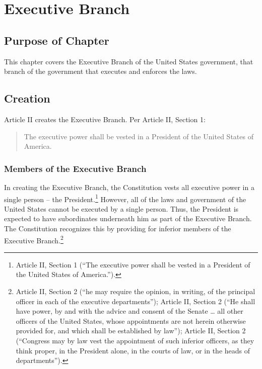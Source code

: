 %
%
%
%
%
%

\chapter{Executive Branch}

\section{Purpose of Chapter}
This chapter covers the Executive Branch of the United States government, that branch of the government that executes and enforces the laws.

\section{Creation}
Article II creates the Executive Branch.  Per Article II, Section 1:

\begin{quote} 
The executive power shall be vested in a President of the United States of America.
\end{quote}

\subsection{Members of the Executive Branch}
In creating the Executive Branch, the Constitution vests all executive power in a single person -- the President.\footnote{Article II, Section 1 (``The executive power shall be vested in a President of the United States of America.'').}  However, all of the laws and government of the United States cannot be executed by a single person.  Thus, the President is expected to have subordinates underneath him as part of the Executive Branch.  The Constitution recognizes this by providing for inferior members of the Executive Branch.\footnote{Article II, Section 2 (``he may require the opinion, in writing, of the principal officer in each of the executive departments''); Article II, Section 2 (``He shall have power, by and with the advice and consent of the Senate … all other officers of the United States, whose appointments are not herein otherwise provided for, and which shall be established by law''); Article II, Section 2 (``Congress may by law vest the appointment of such inferior officers, as they think proper, in the President alone, in the courts of law, or in the heads of departments'').}

